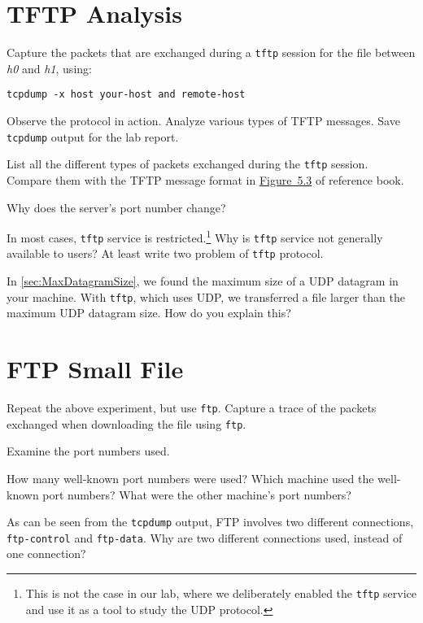 \documentclass{../UTNetLab}
\begin{document}
\section{TFTP Analysis}
    Capture the packets that are exchanged during a \lstinline{tftp} session for the  file between \textit{h0} and \textit{h1}, using:
    \begin{lstlisting}[emph={your-host, remote-host}]
tcpdump -x host your-host and remote-host
    \end{lstlisting}
    Observe the protocol in action.    Analyze various types of TFTP messages. Save \lstinline{tcpdump} output for the lab report.
    
    \begin{report}
        \item List all the different types of packets exchanged during the \lstinline{tftp} session. Compare them with the TFTP message format in \hyperref[fig:5.3]{Figure~5.3} of reference book.

        Why does the server’s port number change?
        
        \item In most cases, \lstinline{tftp} service is restricted.\footnote{This is not the case in our lab, where we deliberately enabled the \lstinline{tftp} service and use it as a tool to study the UDP protocol.}
        Why is \lstinline{tftp} service not generally available to users? At least write two problem of \lstinline{tftp} protocol.
        
        \item In \autoref{sec:MaxDatagramSize}, we found the maximum size of a UDP datagram in your machine. With \lstinline{tftp}, which uses UDP, we transferred a file larger than the maximum UDP datagram size.
        How do you explain this?
    \end{report}

\section{FTP Small File}
    Repeat the above experiment, but use \lstinline{ftp}.
    Capture a trace of the packets exchanged when downloading the  file using \lstinline{ftp}.

    Examine the port numbers used.
    
    \begin{report}
        \item How many well-known port numbers were used?
        Which machine used the well-known port numbers?
        What were the other machine’s port numbers?
        
        \item As can be seen from the \lstinline{tcpdump} output, FTP involves two different connections, \texttt{ftp-control} and \texttt{ftp-data}.
        Why are two different connections used, instead of one connection?
    \end{report}
\end{document}
